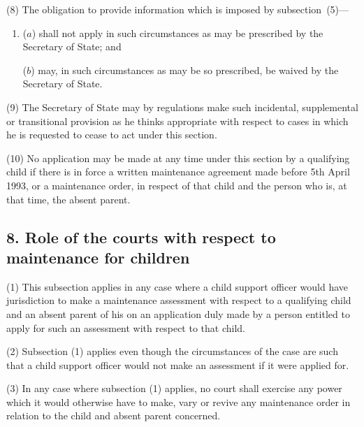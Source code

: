 \documentclass[12pt,a4paper]{article}
\begin{document}
(8) The obligation to provide information which is imposed by subsection~(5)—
\begin{enumerate}\item[]
($a$) shall not apply in such circumstances as may be prescribed by the Secretary of State; and

($b$) may, in such circumstances as may be so prescribed, be waived by the Secretary of State.
\end{enumerate}

(9) The Secretary of State may by regulations make such incidental, supplemental or transitional provision as he thinks appropriate with respect to cases in which he is requested to cease to act under this section.

(10) No application may be made at any time under this section by a qualifying child if there is in force a written maintenance agreement made before 5th April 1993, or a maintenance order, in respect of that child and the person who is, at that time, the absent parent.


\subsection{8. Role of the courts with respect to maintenance for children}

(1) This subsection applies in any case where 
a child support officer 
would have jurisdiction to make a maintenance assessment with respect to a qualifying child and an absent parent of his on an application duly made by a person entitled to apply for such an assessment with respect to that child.

(2) Subsection (1)  applies even though the circumstances of the case are such that
a child support officer 
would not make an assessment if it were applied for.

(3) In any case where subsection (1)  applies, no court shall exercise any power which it would otherwise have to make, vary or revive any maintenance order in relation to the child and absent parent concerned.
\end{document}
